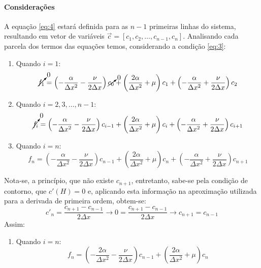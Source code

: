 \documentclass{article}
\begin{document}
        \paragraph{Considerações}A equação \eqref{eq:4} estará definida para as $n - 1$ primeiras linhas do sistema, resultando em vetor de variáveis $\vec{c} = [c_1, c_2, \dots, c_{n-1}, c_{n}]$. Analisando cada parcela dos termos das equações temos, considerando a condição \eqref{eq:3}:
            \begin{enumerate}[noitemsep]
                \item Quando $i = 1$:
                    \[\cancelto{0}{f_{1}} = \left(-\frac{\alpha}{\Delta x^{2}} - \frac{\nu}{2\Delta x}\right) \cancelto{0}{c_{0}} + \left(\frac{2\alpha}{\Delta x^{2}} + \mu\right) c_{1} + \left( - \frac{\alpha}{\Delta x^{2}} + \frac{\nu}{2\Delta x}\right) c_{2}\]
                \item Quando $i = 2, 3, \dots, n-1$:
                    \[\cancelto{0}{f_{i}} = \left(-\frac{\alpha}{\Delta x^{2}} - \frac{\nu}{2\Delta x}\right) c_{i-1} + \left(\frac{2\alpha}{\Delta x^{2}} + \mu\right) c_{i} + \left( - \frac{\alpha}{\Delta x^{2}} + \frac{\nu}{2\Delta x}\right) c_{i+1}\]
                \item Quando $i = n$:
                    \[f_{n} = \left(-\frac{\alpha}{\Delta x^{2}} - \frac{\nu}{2\Delta x}\right) c_{n-1} + \left(\frac{2\alpha}{\Delta x^{2}} + \mu\right) c_{n} + \left( - \frac{\alpha}{\Delta x^{2}} + \frac{\nu}{2\Delta x}\right) c_{n+1}\]
            \end{enumerate}
        Nota-se, a princípio, que não existe $c_{n+1}$, entretanto, sabe-se pela condição de contorno, que $c'(H) = 0$ e, aplicando esta informação na aproximação utilizada para a derivada de primeira ordem, obtem-se:
            \[c'_{n} = \frac{c_{n+1} - c_{n-1}}{2\Delta x} \rightarrow 0 = \frac{c_{n+1} - c_{n-1}}{2\Delta x} \rightarrow \boxed{c_{n+1} = c_{n-1}}\]
        Assim:
            \begin{enumerate}[noitemsep]
                \item Quando $i = n$:
                    \[f_{n} = \left(-\frac{2\alpha}{\Delta x^{2}} - \frac{\nu}{2\Delta x}\right) c_{n-1} + \left(\frac{2\alpha}{\Delta x^{2}} + \mu\right) c_{n}\]
            \end{enumerate}
\end{document}
